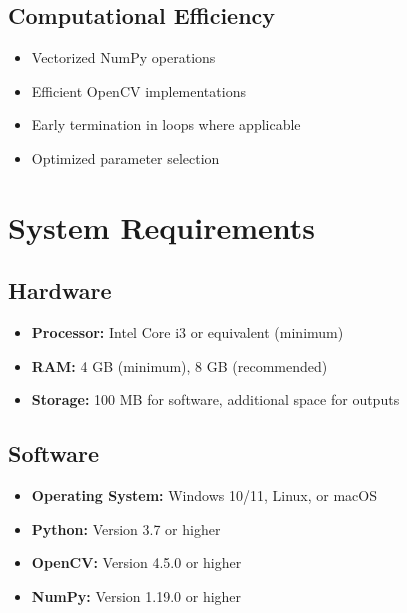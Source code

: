 \documentclass[12pt,a4paper,oneside]{report}
\begin{document}
\subsection{Computational Efficiency}
\begin{itemize}
    \item Vectorized NumPy operations
    \item Efficient OpenCV implementations
    \item Early termination in loops where applicable
    \item Optimized parameter selection
\end{itemize}

\section{System Requirements}

\subsection{Hardware}
\begin{itemize}
    \item \textbf{Processor:} Intel Core i3 or equivalent (minimum)
    \item \textbf{RAM:} 4 GB (minimum), 8 GB (recommended)
    \item \textbf{Storage:} 100 MB for software, additional space for outputs
\end{itemize}

\subsection{Software}
\begin{itemize}
    \item \textbf{Operating System:} Windows 10/11, Linux, or macOS
    \item \textbf{Python:} Version 3.7 or higher
    \item \textbf{OpenCV:} Version 4.5.0 or higher
    \item \textbf{NumPy:} Version 1.19.0 or higher
\end{itemize}

\end{document}
